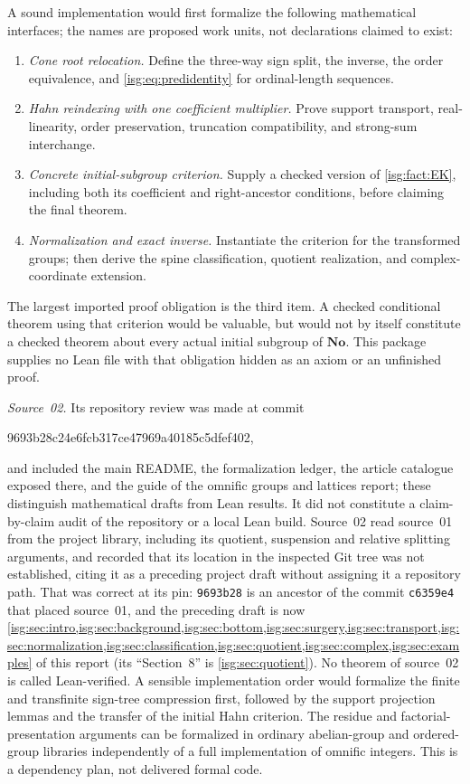 \documentclass[11pt]{article}
\theoremstyle{definition}
\theoremstyle{remark}
\newcommand{\No}{\ensuremath{\mathbf{No}}}
\begin{document}
A sound implementation would first formalize the following mathematical
interfaces; the names are proposed work units, not declarations claimed
to exist:
\begin{enumerate}
\item \emph{Cone root relocation.} Define the three-way sign split,
      the inverse, the order equivalence, and
      \eqref{isg:eq:predidentity} for ordinal-length sequences.
\item \emph{Hahn reindexing with one coefficient multiplier.} Prove
      support transport, real-linearity, order preservation, truncation
      compatibility, and strong-sum interchange.
\item \emph{Concrete initial-subgroup criterion.} Supply a checked
      version of \cref{isg:fact:EK}, including both its coefficient and
      right-ancestor conditions, before claiming the final theorem.
\item \emph{Normalization and exact inverse.} Instantiate the criterion
      for the transformed groups; then derive the spine classification,
      quotient realization, and complex-coordinate extension.
\end{enumerate}

The largest imported proof obligation is the third item. A checked
conditional theorem using that criterion would be valuable, but would
not by itself constitute a checked theorem about every actual initial
subgroup of $\No$. This package supplies no Lean file with that
obligation hidden as an axiom or an unfinished proof.

\emph{Source~02.} Its repository review was made at commit
\begin{center}\small\ttfamily
9693b28c24e6fcb317ce47969a40185c5dfef402,
\end{center}
and included the main README, the formalization ledger, the article
catalogue exposed there, and the guide of the omnific groups and lattices
report; these distinguish mathematical drafts from Lean results. It did
not constitute a claim-by-claim audit of the repository or a local Lean
build. Source~02 read source~01 from the project library, including its
quotient, suspension and relative splitting arguments, and recorded that
its location in the inspected Git tree was not established, citing it as
a preceding project draft without assigning it a repository path. That
was correct at its pin: \texttt{9693b28} is an ancestor of the commit
\texttt{c6359e4} that placed source~01, and the preceding draft is now
\cref{isg:sec:intro,isg:sec:background,isg:sec:bottom,isg:sec:surgery,isg:sec:transport,isg:sec:normalization,isg:sec:classification,isg:sec:quotient,isg:sec:complex,isg:sec:examples}
of this report (its ``Section~8'' is \cref{isg:sec:quotient}). No theorem
of source~02 is called Lean-verified. A sensible implementation order
would formalize the finite and transfinite sign-tree compression first,
followed by the support projection lemmas and the transfer of the initial
Hahn criterion. The residue and factorial-presentation arguments can be
formalized in ordinary abelian-group and ordered-group libraries
independently of a full implementation of omnific integers. This is a
dependency plan, not delivered formal code.
\end{document}

